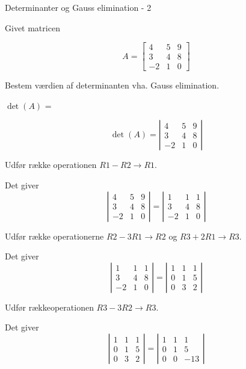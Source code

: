 \documentclass{article}
\begin{document}
\begin{exercise}{Determinanter og Gauss elimination - 2}
	
Givet matricen
	
\[
A = \left[\begin{array}{rrr}
4 & 5 & 9 \\ 
3 & 4 & 8 \\
-2 & 1 & 0
\end{array} \right]
\]

Bestem værdien af determinanten vha. Gauss elimination.

$\det(A)$ = 


\hint
\[
\det(A) = \left|\begin{array}{rrr}
4 & 5 & 9 \\ 
3 & 4 & 8 \\
-2 & 1 & 0
\end{array} \right|
\]


\hint
Udfør række operationen
$R1 - R2 \to R1$.

\hint
Det giver 
\[
\left|\begin{array}{rrr}
4 & 5 & 9 \\ 
3 & 4 & 8 \\
-2 & 1 & 0
\end{array} \right|
=
\left|\begin{array}{rrr}
1 & 1 & 1 \\ 
3 & 4 & 8 \\
-2 & 1 & 0
\end{array} \right|
\]
	
\hint
Udfør række operationerne
$R2 - 3R1 \to R2$ og $R3 + 2R1 \to R3$.

\hint
Det giver
\[
\left|\begin{array}{rrr}
1 & 1 & 1 \\ 
3 & 4 & 8 \\
-2 & 1 & 0
\end{array} \right|
=
\left|\begin{array}{rrr}
1 & 1 & 1 \\ 
0 & 1 & 5 \\
0 & 3 & 2
\end{array} \right|
\]

\hint
Udfør rækkeoperationen
$R3 - 3R2 \to R3$.

\hint
Det giver
\[
\left|\begin{array}{rrr}
1 & 1 & 1 \\ 
0 & 1 & 5 \\
0 & 3 & 2
\end{array} \right|
=
\left|\begin{array}{rrr}
1 & 1 & 1 \\ 
0 & 1 & 5 \\
0 & 0 & -13
\end{array} \right|
\]


\end{exercise}
\end{document}
